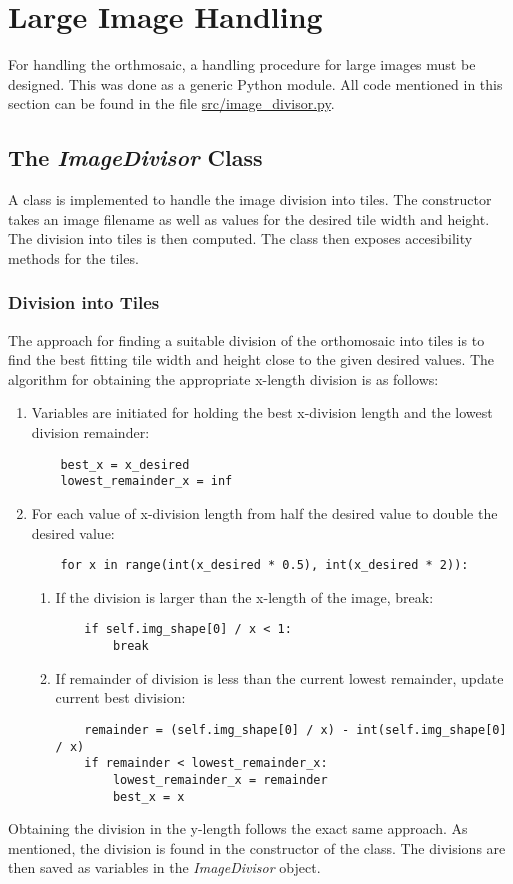 \documentclass[../Head/Main.tex]{subfiles}
\begin{document}
\section{Large Image Handling}\label{sec:imageHandling}
For handling the orthmosaic, a handling procedure for large images must be designed. This was done as a generic Python module. All code mentioned in this section can be found in the file \url{src/image_divisor.py}.

\subsection{The \textit{ImageDivisor} Class}
A class is implemented to handle the image division into tiles. The constructor takes an image filename as well as values for the desired tile width and height. The division into tiles is then computed. The class then exposes accesibility methods for the tiles.

\subsubsection{Division into Tiles}
The approach for finding a suitable division of the orthomosaic into tiles is to find the best fitting tile width and height close to the given desired values. The algorithm for obtaining the appropriate x-length division is as follows:
\begin{enumerate}
\item Variables are initiated for holding the best x-division length and the lowest division remainder:
\begin{verbatim}
    best_x = x_desired
    lowest_remainder_x = inf
\end{verbatim}
\item For each value of x-division length from half the desired value to double the desired value:
\begin{verbatim}
    for x in range(int(x_desired * 0.5), int(x_desired * 2)):
\end{verbatim}
\begin{enumerate}
\item If the division is larger than the x-length of the image, break:
\begin{verbatim}
    if self.img_shape[0] / x < 1:
        break
\end{verbatim}
\item If remainder of division is less than the current lowest remainder, update current best division:
\begin{verbatim}
    remainder = (self.img_shape[0] / x) - int(self.img_shape[0] / x)
    if remainder < lowest_remainder_x:
        lowest_remainder_x = remainder
        best_x = x
\end{verbatim}
\end{enumerate}
\end{enumerate}
Obtaining the division in the y-length follows the exact same approach. As mentioned, the division is found in the constructor of the class. The divisions are then saved as variables in the \textit{ImageDivisor} object.
\end{document}
